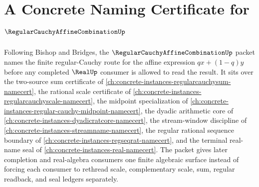 \chapter{A Concrete Naming Certificate for $\RegularCauchyAffineCombinationUp$}
\label{ch:concrete-instances-regular-cauchy-affine-combination-namecert}

Following Bishop and Bridges, the $\RegularCauchyAffineCombinationUp$ packet names the finite regular-Cauchy route for the affine expression $q x+(1-q)y$ before any completed $\RealUp$ consumer is allowed to read the result. It sits over the two-source sum certificate of \autoref{ch:concrete-instances-regularcauchysum-namecert}, the rational scale certificate of \autoref{ch:concrete-instances-regularcauchyscale-namecert}, the midpoint specialization of \autoref{ch:concrete-instances-regular-cauchy-midpoint-namecert}, the dyadic arithmetic core of \autoref{ch:concrete-instances-dyadicratcore-namecert}, the stream-window discipline of \autoref{ch:concrete-instances-streamname-namecert}, the regular rational sequence boundary of \autoref{ch:concrete-instances-regseqrat-namecert}, and the terminal real-name seal of \autoref{ch:concrete-instances-real-namecert}. The packet gives later completion and real-algebra consumers one finite algebraic surface instead of forcing each consumer to rethread scale, complementary scale, sum, regular readback, and seal ledgers separately.


